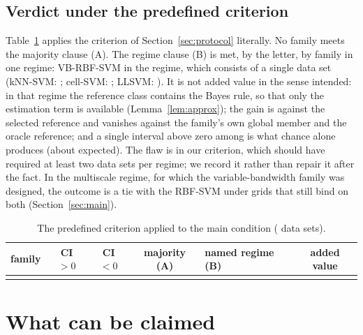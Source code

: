 \documentclass[11pt,a4paper]{article}
\theoremstyle{plain}
\theoremstyle{definition}
\theoremstyle{remark}
\begin{document}
\subsection{Verdict under the predefined criterion}

Table~\ref{tab:criterion} applies the criterion of Section~\ref{sec:protocol} literally. No family meets the majority clause (A). The regime clause (B) is met, by the letter, by \NFamiliesAddedValue{} family in one regime: VB-RBF-SVM in the \emph{\CritVbRegimes} regime, which consists of a single data set (kNN-SVM: \CritKnnRegimes; cell-SVM: \CritCellRegimes; LLSVM: \CritLlsvmRegimes). It is not added value in the sense intended: in that regime the reference class contains the Bayes rule, so that only the estimation term is available (Lemma~\ref{lem:approx}); the gain is against the selected reference and vanishes against the family's own global member and the oracle reference; and a single interval above zero among \NCellsMain{} is what chance alone produces (about \ExpectedPosMain{} expected). The flaw is in our criterion, which should have required at least two data sets per regime; we record it rather than repair it after the fact. In the multiscale regime, for which the variable-bandwidth family was designed, the outcome is a tie with the RBF-SVM under grids that still bind on both (Section~\ref{sec:main}).

\begin{table}[t]
\centering\small
\begin{tabular}{lccclc}
\toprule
family & CI $>0$ & CI $<0$ & majority (A) & named regime (B) & added value\\
\midrule
\\
\bottomrule
\end{tabular}
\caption{The predefined criterion applied to the main condition (\NDatasets{} data sets).}
\label{tab:criterion}
\end{table}

\section{What can be claimed}\label{sec:claims}
\end{document}
